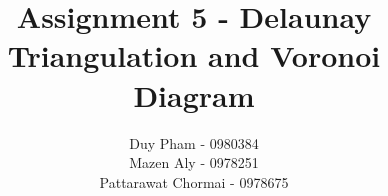 \documentclass{article}
\begin{document}
\title{Assignment 5 - Delaunay Triangulation and Voronoi Diagram }
\author{
	Duy Pham - 0980384 \\
	Mazen Aly - 0978251 \\
	Pattarawat Chormai - 0978675 \\
}
\maketitle



\end{document}
